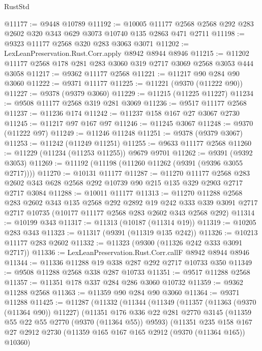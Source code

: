 \begin{lexlean}{RustStd}
\begin{coremodule}
@11177 := @9448 @10789
@11192 := @10005
    @11177
    @2568
    @2568
    @292
    @283
    @2602
    @320
    @343
    @629
    @3073
    @10740
    @135
    @2863
    @471
    @2711
@11198 := @9323 @11177 @2568 @320 @283 @3063 @3071
@11202 := LexLeanPreservation.Rust.Corr.apply @8942 @8944 @8946
@11215 := @11202 @11177 @2568 @178 @281 @283 @3060 @319 @2717 @3069 @2568 @3053 @444 @3058
@11217 := @9362 @11177 @2568
@11221 := @11217 @90 @284 @90 @3060
@11222 := @9371 @11177
@11225 := @11221 (@9370 (@11222 @90))
@11227 := @9378 (@9379 @3060)
@11229 := @11215 (@11225 @11227)
@11234 := @9508 @11177 @2568 @319 @281 @3069
@11236 := @9517 @11177 @2568
@11237 := @11236 @174
@11242 := @11237 @158 @167 @27 @3067 @2730
@11245 := @11217 @97 @167 @97
@11246 := @11245 @3067
@11248 := @9370 (@11222 @97)
@11249 := @11246 @11248
@11251 := @9378 (@9379 @3067)
@11253 := @11242 (@11249 @11251)
@11255 := @9633 @11177 @2568
@11260 := @11229 (@11234 (@11253 @11255)) @9679 @9701
@11262 := @9391 (@9392 @3053)
@11269 := @11192 (@11198 (@11260 @11262 (@9391 (@9396 @3055 @2717))))
@11270 := @10131 @11177
@11287 := @11270
    @11177
    @2568
    @283
    @2602
    @343
    @628
    @2568
    @292
    @10739
    @90
    @215
    @135
    @329
    @2903
    @2717
    @2717
    @3084
@11288 := @10011 @11177
@11313 := @11270
    @11288
    @2568
    @283
    @2602
    @343
    @135
    @2568
    @292
    @2892
    @19
    @242
    @333
    @339
    @3091
    @2717
    @2717
    @10735
    (@10177 @11177 @2568 @283 @2602 @343 @2568 @292)
@11314 := @10199 @343
@11317 := @11313 (@10187 (@11314 @19))
@11319 := @10205 @283 @343
@11323 := @11317 (@9391 (@11319 @135 @242))
@11326 := @10213 @11177 @283 @2602
@11332 := @11323 (@9300 (@11326 @242 @333 @3091 @2717))
@11336 := LexLeanPreservation.Rust.Corr.callF @8942 @8944 @8946
@11344 := @11336 @11288 @19 @338 @287 @292 @2717 @10733 @350
@11349 := @9508 @11288 @2568 @338 @287 @10733
@11351 := @9517 @11288 @2568
@11357 := @11351 @178 @337 @284 @286 @3060 @10732
@11359 := @9362 @11288 @2568
@11363 := @11359 @90 @284 @90 @3060
@11364 := @9371 @11288
@11425 := @11287
    (@11332
      (@11344
        (@11349
          (@11357
            (@11363 (@9370 (@11364 @90)) @11227)
            (@11351
              @176
              @336
              @22
              @281
              @2770
              @3145
              (@11359 @55 @22 @55 @2770 (@9370 (@11364 @55)) @9593)
              (@11351
                @235
                @158
                @167
                @27
                @2912
                @2730
                (@11359 @165 @167 @165 @2912 (@9370 (@11364 @165)) @10360)

\end{coremodule}
\end{lexlean}
